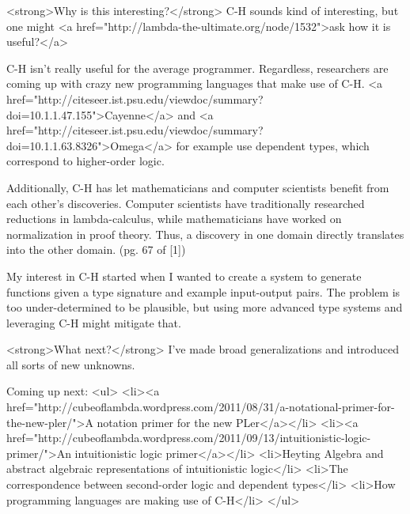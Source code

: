 <strong>Why is this interesting?</strong>
C-H sounds kind of interesting, but one might <a href="http://lambda-the-ultimate.org/node/1532">ask how it is useful?</a>

C-H isn't really useful for the average programmer. Regardless, researchers are coming up with crazy new programming languages that make use of C-H. <a href="http://citeseer.ist.psu.edu/viewdoc/summary?doi=10.1.1.47.155">Cayenne</a> and <a href="http://citeseer.ist.psu.edu/viewdoc/summary?doi=10.1.1.63.8326">Omega</a> for example use dependent types, which correspond to higher-order logic.

Additionally, C-H has let mathematicians and computer scientists benefit from each other's discoveries. Computer scientists have traditionally researched reductions in lambda-calculus, while mathematicians have worked on normalization in proof theory. Thus, a discovery in one domain directly translates into the other domain. (pg. 67 of [1])

My interest in C-H started when I wanted to create a system to generate functions given a type signature and example input-output pairs. The problem is too under-determined to be plausible, but using more advanced type systems and leveraging C-H might mitigate that.

<strong>What next?</strong>
I've made broad generalizations and introduced all sorts of new unknowns.

Coming up next:
<ul>
  <li><a href="http://cubeoflambda.wordpress.com/2011/08/31/a-notational-primer-for-the-new-pler/">A notation primer for the new PLer</a></li>
  <li><a href="http://cubeoflambda.wordpress.com/2011/09/13/intuitionistic-logic-primer/">An intuitionistic logic primer</a></li>
        <li>Heyting Algebra and abstract algebraic representations of intuitionistic logic</li>
  <li>The correspondence between second-order logic and dependent types</li>
  <li>How programming languages are making use of C-H</li>
</ul>
